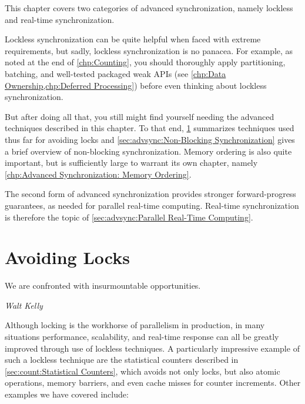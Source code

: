 
%

This chapter covers two categories of advanced
synchronization, namely lockless and real-time synchronization.

Lockless synchronization can be quite helpful when faced with extreme
requirements, but sadly, lockless synchronization is no panacea.
For example, as noted at the end of \cref{chp:Counting},
you should thoroughly apply partitioning, batching, and
well-tested packaged weak APIs
(see \cref{chp:Data Ownership,chp:Deferred Processing})
before even thinking about lockless synchronization.

But after doing all that, you still might find yourself needing the
advanced techniques described in this chapter.
To that end,
\cref{sec:advsync:Avoiding Locks}
summarizes techniques used thus far for avoiding locks and
\cref{sec:advsync:Non-Blocking Synchronization}
gives a brief overview of non-blocking synchronization.
Memory ordering is also quite important, but is sufficiently large
to warrant its own chapter, namely
\cref{chp:Advanced Synchronization: Memory Ordering}.

The second form of advanced synchronization provides stronger forward-progress
guarantees, as needed for parallel real-time computing.
Real-time synchronization is therefore the topic of
\cref{sec:advsync:Parallel Real-Time Computing}.

\section{Avoiding Locks}
\label{sec:advsync:Avoiding Locks}
%
\epigraph{We are confronted with insurmountable opportunities.}
	 {\emph{Walt Kelly}}

Although locking is the workhorse of parallelism in production, in
many situations performance, scalability, and real-time response can
all be greatly improved through use of lockless techniques.
A particularly impressive example of such a lockless technique are
the statistical counters described in
\cref{sec:count:Statistical Counters},
which avoids not only locks, but also atomic operations, memory barriers,
and even cache misses for counter increments.
Other examples we have covered include:

